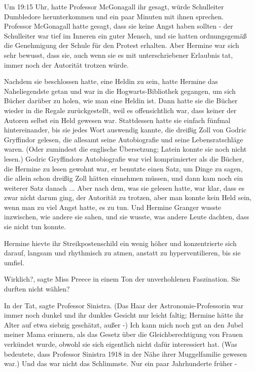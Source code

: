 Um 19:15 Uhr, hatte Professor McGonagall ihr gesagt, würde Schulleiter
Dumbledore herunterkommen und ein paar Minuten mit ihnen sprechen. Professor
McGonagall hatte gesagt, dass sie keine Angst haben sollten - der Schulleiter
war tief im Inneren ein guter Mensch, und sie hatten ordnungsgemäß die
Genehmigung der Schule für den Protest erhalten. Aber Hermine war sich sehr
bewusst, dass sie, auch wenn sie es mit unterschriebener Erlaubnis tat, immer
noch der Autorität trotzen würde.

Nachdem sie beschlossen hatte, eine Heldin zu sein, hatte Hermine das
Naheliegendste getan und war in die Hogwarts-Bibliothek gegangen, um sich Bücher
darüber zu holen, wie man eine Heldin ist. Dann hatte sie die Bücher wieder in
die Regale zurückgestellt, weil es offensichtlich war, dass keiner der Autoren
selbst ein Held gewesen war. Stattdessen hatte sie einfach fünfmal
hintereinander, bis sie jedes Wort auswendig kannte, die dreißig Zoll von Godric
Gryffindor gelesen, die allesamt seine Autobiografie und seine Lebensratschläge
waren. (Oder zumindest die englische Übersetzung; Latein konnte sie noch nicht
lesen.) Godric Gryffindors Autobiografie war viel komprimierter als die Bücher,
die Hermine zu lesen gewohnt war, er benutzte einen Satz, um Dinge zu sagen, die
allein schon dreißig Zoll hätten einnehmen müssen, und dann kam noch ein
weiterer Satz danach ... Aber nach dem, was sie gelesen hatte, war klar, dass es
zwar nicht darum ging, der Autorität zu trotzen, aber man konnte kein Held sein,
wenn man zu viel Angst hatte, es zu tun. Und Hermine Granger wusste inzwischen,
wie andere sie sahen, und sie wusste, was andere Leute dachten, dass sie nicht
tun konnte.

Hermine hievte ihr Streikpostenschild ein wenig höher und konzentrierte sich
darauf, langsam und rhythmisch zu atmen, anstatt zu hyperventilieren, bis sie
umfiel.

\glqq{}Wirklich?\grqq{}, sagte Miss Preece in einem Ton der unverhohlenen
Faszination. \glqq{}Sie durften nicht wählen?\grqq{}

\glqq{}In der Tat\grqq{}, sagte Professor Sinistra. (Das Haar der
Astronomie-Professorin war immer noch dunkel und ihr dunkles Gesicht nur leicht
faltig; Hermine hätte ihr Alter auf etwa siebzig geschätzt, außer -) \glqq{}Ich
kann mich noch gut an den Jubel meiner Mama erinnern, als das Gesetz über die
Gleichberechtigung von Frauen verkündet wurde, obwohl sie sich eigentlich nicht
dafür interessiert hat.\grqq{} (Was bedeutete, dass Professor Sinistra 1918 in
der Nähe ihrer Muggelfamilie gewesen war.) \glqq{}Und das war nicht das
Schlimmste. Nur ein paar Jahrhunderte früher -\grqq{}


